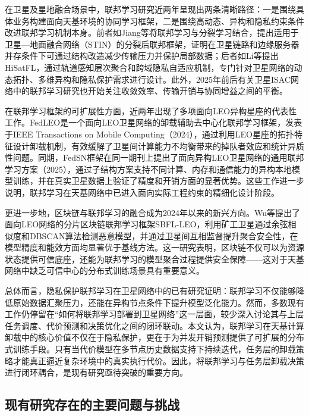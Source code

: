 在卫星及星地融合场景中，联邦学习研究近两年呈现出两条清晰路径：一是围绕具体业务构建面向天基环境的协同学习框架，二是围绕高动态、异构和隐私约束条件改进联邦学习机制本身。前者如Jiang等将联邦学习与分裂学习结合，提出适用于卫星—地面融合网络（STIN）的分裂后联邦框架，证明在卫星链路和边缘服务器并存条件下可通过结构改造减少传输压力并保护局部数据\cite{ref11}；后者如Li等提出HiSatFL，通过轨道感知层次聚合和跨域隐私自适应机制，专门针对卫星网络的动态拓扑、多维异构和隐私保护需求进行设计\cite{ref10}。此外，2025年前后有关卫星ISAC网络中的联邦学习研究也开始关注收敛效率、传输开销与协同增益之间的平衡\cite{ref17}。

在联邦学习框架的可扩展性方面，近两年出现了多项面向LEO异构星座的代表性工作。FedLEO是一个面向LEO卫星网络的卸载辅助去中心化联邦学习框架，发表于IEEE Transactions on Mobile Computing（2024），通过利用LEO星座的拓扑特征设计卸载机制，有效缓解了卫星间计算能力不均衡带来的掉队者效应和统计异质性问题\cite{ref30}。同期，FedSN框架在同一期刊上提出了面向异构LEO卫星网络的通用联邦学习方案（2025），通过子结构方案支持不同计算、内存和通信能力的异构本地模型训练，并在真实卫星数据上验证了精度和开销方面的显著优势。这些工作进一步说明，联邦学习在天基网络中已进入面向实际工程约束的精细化设计阶段。

更进一步地，区块链与联邦学习的融合成为2024年以来的新兴方向。Wu等提出了面向LEO网络的分片区块链联邦学习框架SBFL-LEO，利用矿工卫星通过余弦相似度和DBSCAN算法检测恶意模型，并通过卫星间互相监督提升聚合安全性，在模型精度和能效方面均显著优于基线方法\cite{ref29}。这一研究表明，区块链不仅可以为资源状态提供可信底座，还能为联邦学习的模型聚合过程提供安全保障——这对于天基网络中缺乏可信中心的分布式训练场景具有重要意义。

总体而言，隐私保护联邦学习在卫星网络中的已有研究证明：联邦学习不仅能够降低原始数据汇聚压力，还能在异构节点条件下提升模型泛化能力。然而，多数现有工作仍停留在“如何将联邦学习部署到卫星网络”这一层面，较少深入讨论其与上层任务调度、代价预测和决策优化之间的闭环联动。本文认为，联邦学习在天基计算卸载中的核心价值不仅在于隐私保护，更在于为并发开销预测提供了可扩展的分布式训练手段。只有当代价模型在多节点历史数据支持下持续迭代，任务层的卸载策略才能真正逼近复杂环境中的真实执行代价。因此，将联邦学习与任务层卸载决策进行闭环耦合，是现有研究亟待突破的重要方向。

\subsection{现有研究存在的主要问题与挑战}

